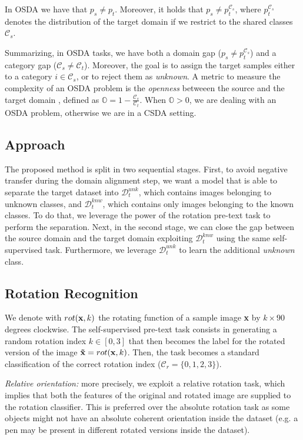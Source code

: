 \documentclass[10pt,twocolumn,letterpaper]{article}
\begin{document}
In OSDA we have that $p_s \neq p_t$.
Moreover, it holds that $p_s \neq p_t^{\mathcal{C}_s}$, where $p_t^{\mathcal{C}_s}$ denotes the distribution of the target domain if we restrict to
the shared classes $\mathcal{C}_s$. 

Summarizing, in OSDA tasks, we have both a domain gap ($p_s \neq p_t^{\mathcal{C}_s}$)
and a category gap ($\mathcal{C}_s \neq \mathcal{C}_t$). Moreover, the goal is to assign the target samples either to a category ${i \in \mathcal{C}_s}$,
or to reject them as {\it unknown}.
A metric to measure the complexity of an OSDA problem is the {\it openness} betweeen the source and the target domain \cite{bendale2015open}, 
defined as $\displaystyle \mathbb{O} = 1-\frac{\mathcal{C}_s}{\mathcal{C}_t}$.
When $\mathbb{O} > 0$, we are dealing with an OSDA problem, otherwise we are in a CSDA setting.

\subsection{Approach}
\label{sec:apporach}
The proposed method is split in two sequential stages. First, to avoid negative transfer during the domain alignment step, we want a model
that is able to separate the target dataset into $\mathcal{D}_t^{unk}$, which contains images belonging to unknown classes,
and $\mathcal{D}_t^{knw}$, which contains only images belonging to the known classes. To do that, we leverage the
power of the rotation pre-text task to perform the separation.
Next, in the second stage, we can close the gap between the source domain and the target domain exploiting $\mathcal{D}_t^{knw}$
using the same self-supervised task. Furthermore, we leverage $\mathcal{D}_t^{unk}$ to learn the additional {\it unknown} class.

\subsection{Rotation Recognition}
\label{sec:rotrecognition}

We denote with $rot({\bf x}, k)$ the rotating function of a sample image {\bf x} by $k\times 90$ degrees clockwise.
The self-supervised pre-text task consists in generating a random rotation index $k \in [0, 3]$ that then becomes
the label for the rotated version of the image ${\bf \tilde{x}} = rot({\bf x}, k)$.
Then, the task becomes a standard classification of the correct rotation index ($\mathcal{C}_r = \{0, 1, 2, 3\}$).

{\it Relative orientation:}
more precisely, we exploit a relative rotation task,
which implies that both the features of the original and rotated image are supplied to the rotation classifier.
This is preferred over the absolute rotation task as some objects might not have an absolute coherent orientation
inside the dataset
(e.g. a pen may be present in different rotated versions inside the dataset). 
\end{document}
